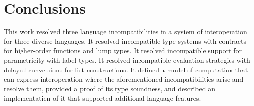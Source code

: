\chapter{Conclusions}

This work resolved three language incompatibilities in a system of interoperation for three diverse languages.  It resolved incompatible type systems with contracts for higher-order functions and lump types.  It resolved incompatible support for parametricity with label types.  It resolved incompatible evaluation strategies with delayed conversions for list constructions.  It defined a model of computation that can express interoperation where the aforementioned incompatibilities arise and resolve them, provided a proof of its type soundness, and described an implementation of it that supported additional language features.